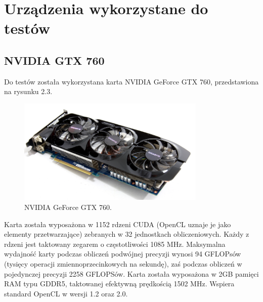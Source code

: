\section{Urządzenia wykorzystane do testów}
\subsection{NVIDIA GTX 760}
Do testów została wykorzystana karta NVIDIA GeForce GTX 760, przedstawiona na rysunku 2.3. \\
\begin{figure}[h]
\centering
\includegraphics[width=0.8\textwidth]{figures/gtx.png}
\caption{NVIDIA GeForce GTX 760.}%
\label{rys:NVIDIA GeForce GTX 760}
\end{figure}
Karta została wyposażona w 1152 rdzeni CUDA (OpenCL uznaje je jako elementy przetwarzające) zebranych w 32 jednostkach obliczeniowych. Każdy z rdzeni jest taktowany zegarem o częstotliwości 1085 MHz. Maksymalna wydajność karty podczas obliczeń podwójnej precyzji wynosi 94 GFLOPsów (tysięcy operacji zmiennoprzecinkowych na sekundę), zaś podczas obliczeń w pojedynczej precyzji 2258 GFLOPSów. Karta została wyposażona w 2GB pamięci RAM typu GDDR5, taktowanej efektywną prędkością 1502 MHz. Wspiera standard OpenCL w wersji 1.2 oraz 2.0.\\
\newpage
